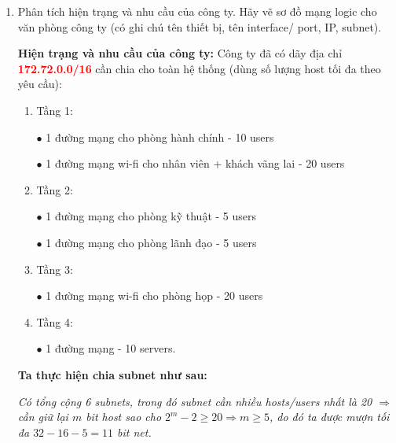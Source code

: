 \begin{enumerate}
\bf \item Phân tích hiện trạng và nhu cầu của công ty. Hãy vẽ sơ đồ mạng logic cho văn phòng công ty (có ghi chú tên thiết bị, tên interface/ port, IP, subnet).

\rm \textbf{Hiện trạng và nhu cầu của công ty:} Công ty đã có dãy địa chỉ \textcolor{red}{\bf 172.72.0.0/16} cần chia cho toàn hệ thống (dùng số lượng host tối đa theo yêu cầu):

\begin{enumerate}
\item Tầng 1: 

\(\bullet\) 1 đường mạng cho phòng hành chính - 10 users

\(\bullet\) 1 đường mạng wi-fi cho nhân viên + khách vãng lai - 20 users

\item Tầng 2:

\(\bullet\) 1 đường mạng cho phòng kỹ thuật - 5 users

\(\bullet\) 1 đường mạng cho phòng lãnh đạo - 5 users

\item Tầng 3:

\(\bullet\) 1 đường mạng wi-fi cho phòng họp - 20 users

\item Tầng 4:

\(\bullet\) 1 đường mạng - 10 servers.

\end{enumerate}

\textbf{Ta thực hiện chia subnet như sau:}

\it Có tổng cộng 6 subnets, trong đó subnet cần nhiều hosts/users nhất là 20 \(\Rightarrow\) cần giữ lại \(m\) bit host sao cho \(2^m-2\ge 20\Rightarrow m\ge 5\), do đó ta được mượn tối đa \(32-16-5 = 11\) bit net. 


\end{enumerate}
